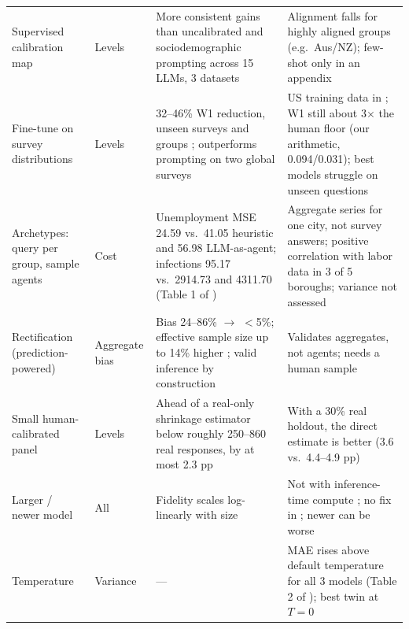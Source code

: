 \documentclass[11pt]{article}
\begin{document}
\begin{table}[!htbp]
\begin{tabular}{@{}L{2.8cm}L{1.9cm}L{5.2cm}L{4.4cm}@{}}
Supervised calibration map & Levels & More consistent gains than uncalibrated and sociodemographic prompting across 15 LLMs, 3 datasets \citep{kambhatla2025} & Alignment falls for highly aligned groups (e.g.\ Aus/NZ); few-shot only in an appendix \\
Fine-tune on survey distributions & Levels & 32--46\% W1 reduction, unseen surveys and groups \citep{suh2025subpop}; outperforms prompting on two global surveys \citep{cao2025} & US training data in \citet{suh2025subpop}; W1 still about 3$\times$ the human floor (our arithmetic, 0.094/0.031); best models struggle on unseen questions \citep{cao2025} \\
Archetypes: query per group, sample agents & Cost & Unemployment MSE 24.59 vs.\ 41.05 heuristic and 56.98 LLM-as-agent; infections 95.17 vs.\ 2914.73 and 4311.70 (Table 1 of \citealp{chopra2024archetypes}) & Aggregate series for one city, not survey answers; positive correlation with labor data in 3 of 5 boroughs; variance not assessed \\
Rectification (prediction-powered) & Aggregate bias & Bias 24--86\% $\to$ $<$5\%; effective sample size up to 14\% higher \citep{krsteski2025}; valid inference by construction \citep{angelopoulos2023,egami2023,broska2024} & Validates aggregates, not agents; needs a human sample \\
Small human-calibrated panel & Levels & Ahead of a real-only shrinkage estimator below roughly 250--860 real responses, by at most 2.3 pp \citep{kim2026korean} & With a 30\% real holdout, the direct estimate is better (3.6 vs.\ 4.4--4.9 pp) \\
Larger / newer model & All & Fidelity scales log-linearly with size \citep{hu2025simbench} & Not with inference-time compute \citep{hu2025simbench}; no fix in \citet{chen2026synthetic,peng2025funhouse}; newer can be worse \citep{lee2026openweight} \\
Temperature & Variance & --- & MAE rises above default temperature for all 3 models (Table 2 of \citealp{lee2026openweight}); best twin at $T=0$ \citep{peng2025funhouse} \\
\bottomrule
\end{tabular}
\end{table}
\end{document}
